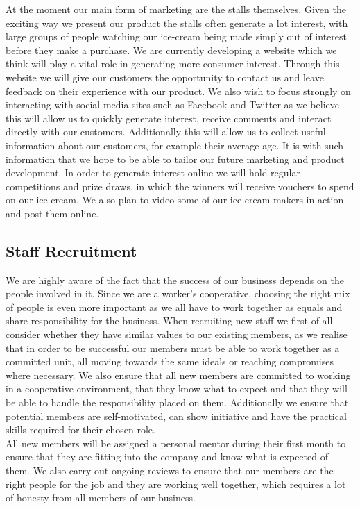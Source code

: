 \documentclass{article}
\begin{document}
  At the moment our main form of marketing are the stalls themselves. Given the exciting way we present our product the stalls often generate a lot interest, with large groups of people watching our ice-cream being made simply out of interest before they make a purchase. We are currently developing a website which we think will play a vital role in generating more consumer interest. Through this website we will give our customers the opportunity to contact us and leave feedback on their experience with our product. We also wish to focus strongly on interacting with social media sites such as Facebook and Twitter as we believe this will allow us to quickly generate interest, receive comments and interact directly with our customers. Additionally this will allow us to collect useful information about our customers, for example their average age. It is with such information that we hope to be able to tailor our future marketing and product development. In order to generate interest online we will hold regular competitions and prize draws, in which the winners will receive vouchers to spend on our ice-cream. We also plan to video some of our ice-cream makers in action and post them online.

  \subsection{Staff Recruitment}

  We are highly aware of the fact that the success of our business depends on the people involved in it. Since we are a worker's cooperative, choosing the right mix of people is even more important as we all have to work together as equals and share responsibility for the business. When recruiting new staff we first of all consider whether they have similar values to our existing members, as we realise that in order to be successful our members must be able to work together as a committed unit, all moving towards the same ideals or reaching compromises where necessary. We also ensure that all new members are committed to working in a cooperative environment, that they know what to expect and that they will be able to handle the responsibility placed on them. Additionally we ensure that potential members are self-motivated, can show initiative and have the practical skills required for their chosen role. \\

  All new members will be assigned a personal mentor during their first month to ensure that they are fitting into the company and know what is expected of them. We also carry out ongoing reviews to ensure that our members are the right people for the job and they are working well together, which requires a lot of honesty from all members of our business. \\
\end{document}
